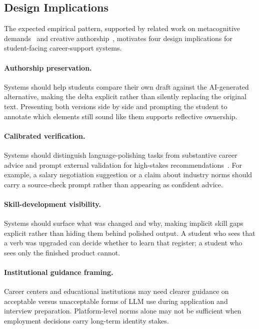 \documentclass[sigconf,review,anonymous]{acmart}
\begin{document}
\subsection{Design Implications}

The expected empirical pattern, supported by related work on metacognitive
demands~\cite{tankelevitch2024metacognitive} and creative
authorship~\cite{chakrabarty2024artorartifice}, motivates four design
implications for student-facing career-support systems.

\paragraph{Authorship preservation.}
Systems should help students compare their own draft against the AI-generated
alternative, making the delta explicit rather than silently replacing the
original text.  Presenting both versions side by side and prompting the
student to annotate which elements still sound like them supports reflective
ownership.

\paragraph{Calibrated verification.}
Systems should distinguish language-polishing tasks from substantive career
advice and prompt external validation for high-stakes
recommendations~\cite{schemmer2023appropriatereliance}.  For example, a
salary negotiation suggestion or a claim about industry norms should carry a
source-check prompt rather than appearing as confident advice.

\paragraph{Skill-development visibility.}
Systems should surface what was changed and why, making implicit skill gaps
explicit rather than hiding them behind polished output.  A student who sees
that a verb was upgraded can decide whether to learn that register; a student
who sees only the finished product cannot.

\paragraph{Institutional guidance framing.}
Career centers and educational institutions may need clearer guidance on
acceptable versus unacceptable forms of LLM use during application and
interview preparation.  Platform-level norms alone may not be sufficient
when employment decisions carry long-term identity stakes.
\end{document}
